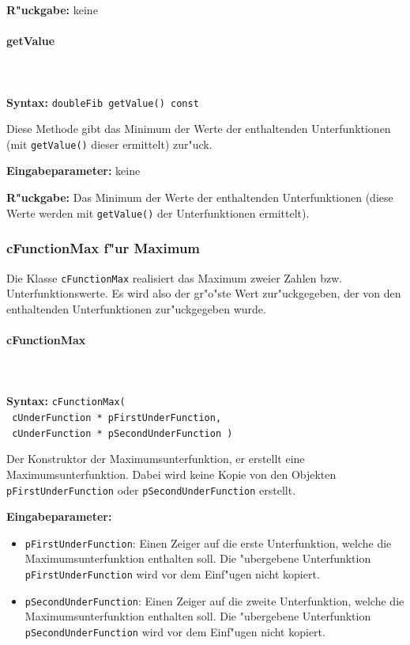 \bigskip\noindent
\textbf{R"uckgabe:} keine


\paragraph{getValue}

\ \\\\\noindent
\textbf{Syntax:} \verb|doubleFib getValue() const|

\bigskip\noindent
Diese Methode gibt das Minimum der Werte der enthaltenden Unterfunktionen (mit \verb|getValue()| dieser ermittelt) zur"uck.

\bigskip\noindent
\textbf{Eingabeparameter:} keine

\bigskip\noindent
\textbf{R"uckgabe:} Das Minimum der Werte der enthaltenden Unterfunktionen (diese Werte werden mit \verb|getValue()| der Unterfunktionen ermittelt).


\subsubsection{cFunctionMax f"ur Maximum}

Die Klasse \verb|cFunctionMax| realisiert das Maximum zweier Zahlen bzw. Unterfunktionswerte. Es wird also der gr"o"ste Wert zur"uckgegeben, der von den enthaltenden Unterfunktionen zur"uckgegeben wurde.

\paragraph{cFunctionMax}

\ \\\\\noindent
\textbf{Syntax:} \verb|cFunctionMax(| \\\verb| cUnderFunction * pFirstUnderFunction,| \\\verb| cUnderFunction * pSecondUnderFunction )|

\bigskip\noindent
Der Konstruktor der Maximumsunterfunktion, er erstellt eine Maximumsunterfunktion. Dabei wird keine Kopie von den Objekten \verb|pFirstUnderFunction| oder \verb|pSecondUnderFunction| erstellt.

\bigskip\noindent
\textbf{Eingabeparameter:}
\begin{itemize}
 \item \verb|pFirstUnderFunction|: Einen Zeiger auf die erste Unterfunktion, welche die Maximumsunterfunktion enthalten soll. Die "ubergebene Unterfunktion \verb|pFirstUnderFunction| wird vor dem Einf"ugen nicht kopiert.
 \item \verb|pSecondUnderFunction|: Einen Zeiger auf die zweite Unterfunktion, welche die Maximumsunterfunktion enthalten soll. Die "ubergebene Unterfunktion \verb|pSecondUnderFunction| wird vor dem Einf"ugen nicht kopiert.
\end{itemize}

